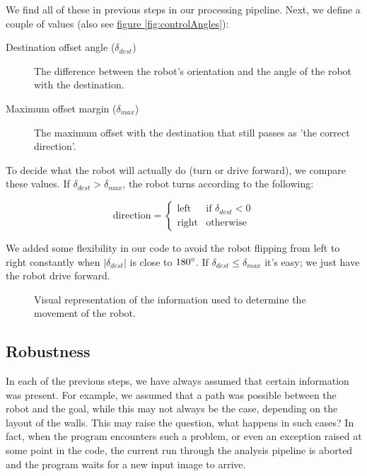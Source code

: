 \documentclass[10pt, abstracton, twocolumn]{scrartcl}
\newcommand{\fref}[1]{\hyperref[#1]{figure \vref{#1}}}
\begin{document}
We find all of these in previous steps in our processing pipeline. Next, we define a couple of values (also see \fref{fig:controlAngles}):

\begin{description}
\item[Destination offset angle ($\delta_{dest}$)] The difference between the robot's orientation and the angle of the robot with the destination.
\item[Maximum offset margin ($\delta_{max}$)] The maximum offset with the destination that still passes as 'the correct direction'.
\end{description}

To decide what the robot will actually do (turn or drive forward), we compare these values. If $\delta_{dest} > \delta_{max}$, the robot turns according to the following:

\[
\textrm{direction} =
\begin{cases}
\textrm{left} & \textrm{if } \delta_{dest} < 0 \\
\textrm{right} & \textrm{otherwise}
\end{cases}
\]

We added some flexibility in our code to avoid the robot flipping from left to right constantly when $\lvert \delta_{dest}\rvert$ is close to $180\degree$.
If $\delta_{dest} \leq \delta_{max}$ it's easy; we just have the robot drive forward.

\begin{figure}
        \centering
        
        \caption{\small Visual representation of the information used to determine the movement of the robot.}
        \label{fig:controlAngles}
\end{figure}

\subsection{Robustness}
In each of the previous steps, we have always assumed that certain information was present. For example, we assumed that a path was possible between the robot and the goal, while this may not always be the case, depending on the layout of the walls. This may raise the question, what happens in such cases? In fact, when the program encounters such a problem, or even an exception raised at some point in the code, the current run through the analysis pipeline is aborted and the program waits for a new input image to arrive.
\end{document}
